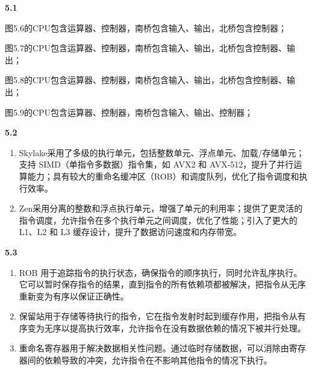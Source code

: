 \documentclass[UTF8]{report}
\begin{document}
\pagestyle{fancy}

\maketitle

\noindent
\textbf{5.1}

图5.6的CPU包含运算器、控制器，南桥包含输入、输出，北桥包含控制器；

图5.7的CPU包含运算器、控制器，南桥包含输入、输出，北桥包含控制器、输出；

图5.8的CPU包含运算器、控制器，南桥包含输入、输出，北桥包含控制器、输出；

图5.9的CPU包含运算器、控制器，南桥包含输入、输出、控制器；

\noindent
\textbf{5.2}

\begin{enumerate}
    \item Skylake采用了多级的执行单元，包括整数单元、浮点单元、加载/存储单元；支持 SIMD（单指令多数据）指令集，如 AVX2 和 AVX-512，提升了并行运算能力；具有较大的重命名缓冲区（ROB）和调度队列，优化了指令调度和执行效率。
    \item Zen采用分离的整数和浮点执行单元，增强了单元的利用率；提供了更灵活的指令调度，允许指令在多个执行单元之间调度，优化了性能；引入了更大的 L1、L2 和 L3 缓存设计，提升了数据访问速度和内存带宽。  
\end{enumerate}

\noindent
\textbf{5.3}

\begin{enumerate}
    \item ROB 用于追踪指令的执行状态，确保指令的顺序执行，同时允许乱序执行。它可以暂时保存指令的结果，直到指令的所有依赖项都被解决，把指令从无序重新变为有序以保证正确性。
    \item 保留站用于存储等待执行的指令，它在指令发射时起到缓存作用，把指令从有序变为无序以提高执行效率，允许指令在没有数据依赖的情况下被并行处理。
    \item 重命名寄存器用于解决数据相关性问题。通过临时存储数据，可以消除由寄存器间的依赖导致的冲突，允许指令在不影响其他指令的情况下执行。
\end{enumerate}
\end{document}
